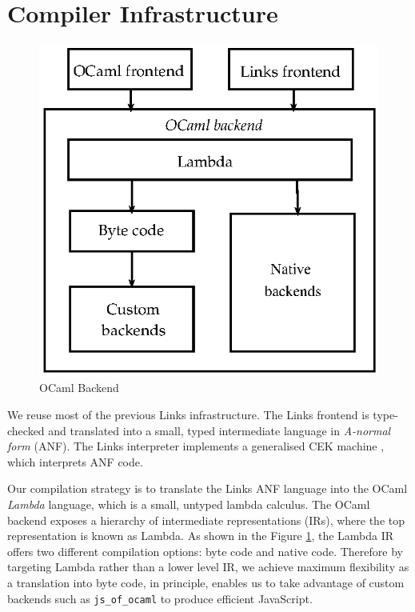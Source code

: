 \documentclass[preprint,numbers]{sigplanconf}
\newcommand{\msgbox}[2]{{%
  \par\noindent\small\color{red}%
  \framebox{\parbox{\dimexpr\linewidth-2\fboxsep-2\fboxrule}{\textbf{#1:} #2}}%
}}
\newcommand{\dhil}[1]{\msgbox{Daniel}{#1}}
\begin{document}
\section{Compiler Infrastructure}
\begin{figure}
  \centering
  \includegraphics[scale=0.65]{infrastructure-alt.eps}
  \caption{OCaml Backend}\label{fig:infra-diagram}
\end{figure}
We reuse most of the previous Links infrastructure. The Links frontend
is type-checked and translated into a small, typed intermediate
language in \emph{A-normal form} (ANF). The Links interpreter
implements a generalised CEK machine \cite{Hillerstrom2016}, which
interprets ANF code.

Our compilation strategy is to translate the Links ANF language into the OCaml
\emph{Lambda} language, which is a small, untyped lambda calculus. The OCaml
backend exposes a hierarchy of intermediate representations (IRs), where the
top representation is known as Lambda. As shown in the Figure
\ref{fig:infra-diagram}, the Lambda IR offers two different compilation
options: byte code and native code. Therefore by targeting Lambda rather than
a lower level IR, we achieve maximum flexibility as a translation into byte
code, in principle, enables us to take advantage of custom backends such as
\texttt{js\_of\_ocaml} to produce efficient JavaScript.
\end{document}
